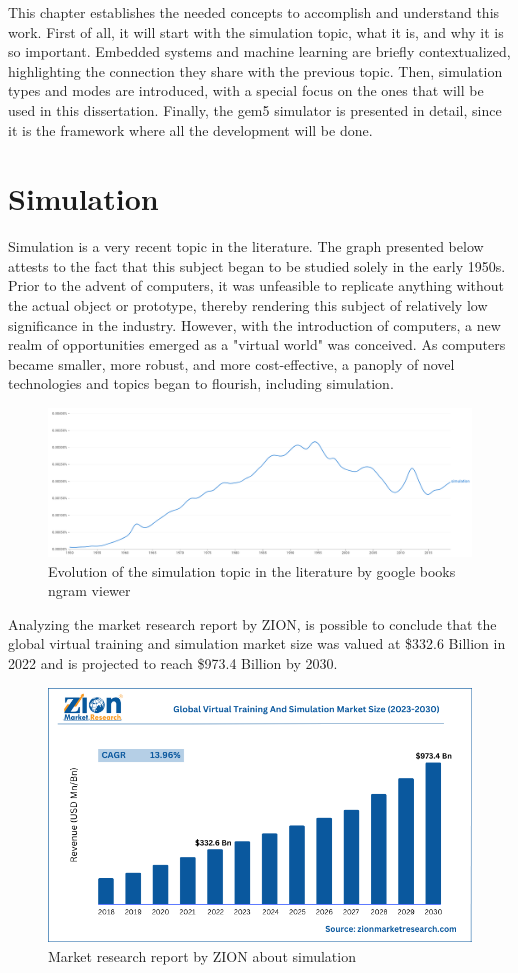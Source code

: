 
This chapter establishes the needed concepts to accomplish and understand this work. First of all, it will start with the simulation topic, what it is, and why it is so important. Embedded systems and machine learning are briefly contextualized, highlighting the connection they share with the previous topic. Then, simulation types and modes are introduced, with a special focus on the ones that will be used in this dissertation. Finally, the gem5 simulator is presented in detail, since it is the framework where all the development will be done.


\section{Simulation}

Simulation is a very recent topic in the literature. The graph presented below attests to the fact that this subject began to be studied solely in the early 1950s. Prior to the advent of computers, it was unfeasible to replicate anything without the actual object or prototype, thereby rendering this subject of relatively low significance in the industry. However, with the introduction of computers, a new realm of opportunities emerged as a "virtual world" was conceived. As computers became smaller, more robust, and more cost-effective, a panoply of novel technologies and topics began to flourish, including simulation. 

\begin{figure}[H]
	\centering
 	\includegraphics[width=0.7\linewidth]{Images/simulation_evolution_graph.png}
 	\caption{Evolution of the simulation topic in the literature by google books ngram viewer}
	 \label{fig_simulation_evolution_graph}
\end{figure}

Analyzing the market research report by ZION, is possible to conclude that the global virtual training and simulation market size was valued at \$332.6 Billion in 2022 and is projected to reach \$973.4 Billion by 2030.  

\begin{figure}[H]
	\centering
 	\includegraphics[width=0.7\linewidth]{Images/ZION_MarketResearch.png}
 	\caption{Market research report by ZION about simulation \cite{zionMarketResearch}}
	 \label{fig_ZION_MarketResearch}
\end{figure}

